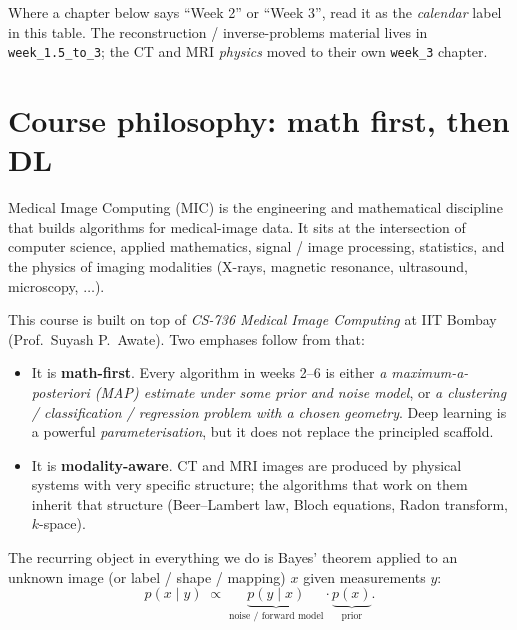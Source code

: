\documentclass[11pt,a4paper]{article}
\begin{document}
\noindent Where a chapter below says ``Week 2'' or ``Week 3'', read it as the
\emph{calendar} label in this table. The reconstruction / inverse-problems
material lives in \texttt{week\_1.5\_to\_3}; the CT and MRI \emph{physics} moved
to their own \texttt{week\_3} chapter.

\tableofcontents
\newpage

\section{Course philosophy: math first, then DL}

Medical Image Computing (MIC) is the engineering and mathematical
discipline that builds algorithms for medical-image data. It sits at
the intersection of computer science, applied mathematics, signal /
image processing, statistics, and the physics of imaging modalities
(X-rays, magnetic resonance, ultrasound, microscopy, $\ldots$).

This course is built on top of \emph{CS-736 Medical Image Computing} at
IIT Bombay (Prof.~Suyash P.~Awate). Two emphases follow from that:

\begin{itemize}[leftmargin=*,nosep]
  \item It is \textbf{math-first}. Every algorithm in weeks 2--6 is
        either \emph{a maximum-a-posteriori (MAP) estimate under some
        prior and noise model}, or \emph{a clustering / classification
        / regression problem with a chosen geometry}. Deep learning is
        a powerful \emph{parameterisation}, but it does not replace
        the principled scaffold.
  \item It is \textbf{modality-aware}. CT and MRI images are produced
        by physical systems with very specific structure; the
        algorithms that work on them inherit that structure
        (Beer--Lambert law, Bloch equations, Radon transform, $k$-space).
\end{itemize}

The recurring object in everything we do is Bayes' theorem applied to
an unknown image (or label / shape / mapping) $x$ given measurements $y$:
\begin{equation}
  p(x \mid y) \;\propto\; \underbrace{p(y \mid x)}_{\text{noise / forward model}} \cdot \underbrace{p(x)}_{\text{prior}}.
  \label{eq:bayes-image}
\end{equation}
\end{document}
